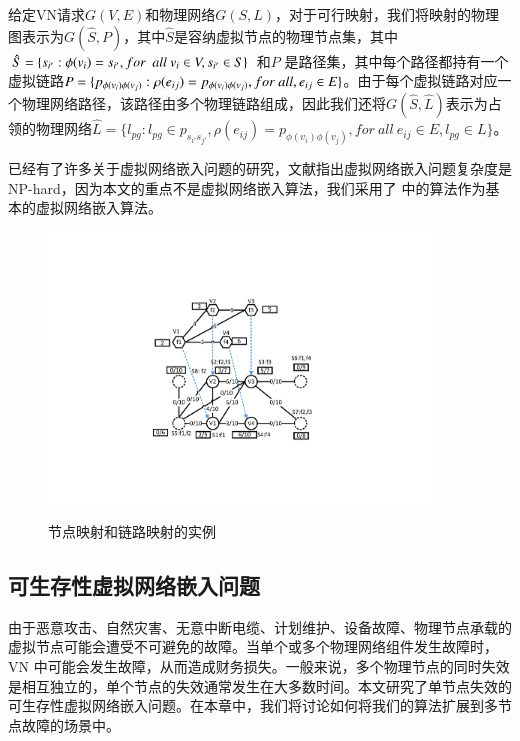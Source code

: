 给定VN请求$G(V,E)$和物理网络$G(S,L)$，对于可行映射，我们将映射的物理图表示为$G\left( {\hat S,P} \right)$，其中$\hat S$是容纳虚拟节点的物理节点集，其中$\hat S = \{ {s_{i'}}:\phi({v_i}) = {s_{i'}},for\ \ {\rm{ }}all\ {v_i} \in V,{s_{i'}} \in S\}$ 和$P$ 是路径集，其中每个路径都持有一个虚拟链路$P = \{ p_{\phi({v_i}) \phi({v_j})}:\rho(e_{ij}) = p_{\phi({v_i}) \phi({v_j})}{\rm{ }}, for\ all,{e_{ij}} \in E\}$。由于每个虚拟链路对应一个物理网络路径，该路径由多个物理链路组成，因此我们还将$G\left( {\hat S,\hat L} \right)$表示为占领的物理网络$\hat L = \{ {l_{pg}}:{l_{pg}} \in {p_{s_{i'}s_{j'}}}, \rho(e_{ij}) = p_{\phi({v_i}) \phi({v_j})},for\ all\ {e_{ij}} \in E,{l_{pg}} \in L\}$。

已经有了许多关于虚拟网络嵌入问题\cite{liu2011completing}的研究，文献指出虚拟网络嵌入问题复杂度是NP-hard，因为本文的重点不是虚拟网络嵌入算法，我们采用了\cite{lischka2009virtual} 中的算法作为基本的虚拟网络嵌入算法。


\begin{figure}[htbp]
\centering
\includegraphics[width=4in]{figures/VirtualNetworkEmbedding}\\
\caption{节点映射和链路映射的实例}\label{fig:VirtualNetworkEmbedding}
\end{figure}
\subsection{可生存性虚拟网络嵌入问题}
由于恶意攻击、自然灾害、无意中断电缆、计划维护、设备故障、物理节点承载的虚拟节点可能会遭受不可避免的故障。当单个或多个物理网络组件发生故障时，VN 中可能会发生故障，从而造成财务损失。一般来说，多个物理节点的同时失效是相互独立的，单个节点的失效通常发生在大多数时间\cite{yeow2010designing}。本文研究了单节点失效的可生存性虚拟网络嵌入问题。在本章中，我们将讨论如何将我们的算法扩展到多节点故障的场景中。

